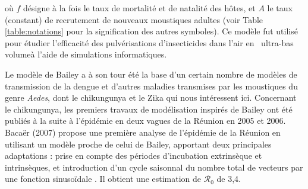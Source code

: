 où $f$ désigne à la fois le taux de mortalité et de natalité des hôtes, et $A$ le taux (constant) de recrutement de nouveaux moustiques adultes (voir Table \ref{table:notations} pour la signification des autres symboles).
Ce modèle fut utilisé pour étudier l'efficacité des pulvérisations d'insecticides dans l'air en \guillemotleft\, ultra-bas volume\guillemotright à l'aide de simulations informatiques. 

Le modèle de Bailey a à son tour été la base d'un certain nombre de modèles de transmission de la dengue et d'autres maladies transmises par les moustiques du genre {\em Aedes}, dont le chikungunya et le Zika qui nous intéressent ici.
Concernant le chikungunya, les premiers travaux de modélisation inspirés de Bailey ont été publiés à la suite à l'épidémie en deux vagues de la Réunion en 2005 et 2006.
Bacaër (2007) propose une première analyse de l'épidémie de la Réunion en utilisant un modèle proche de celui de Bailey, apportant deux principales adaptations : prise en compte des périodes d'incubation extrinsèque et intrinsèques, et introduction d'un cycle saisonnal du nombre total de vecteurs par une fonction sinusoïdale \cite{bacaer2007approximation}. 
Il obtient une estimation de $\mathcal{R}_0$ de 3,4.

